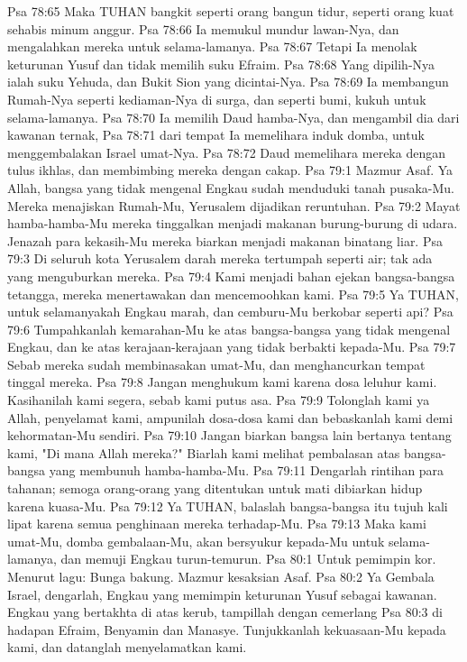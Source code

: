 Psa 78:65  Maka TUHAN bangkit seperti orang bangun tidur, seperti orang kuat sehabis minum anggur.
Psa 78:66  Ia memukul mundur lawan-Nya, dan mengalahkan mereka untuk selama-lamanya.
Psa 78:67  Tetapi Ia menolak keturunan Yusuf dan tidak memilih suku Efraim.
Psa 78:68  Yang dipilih-Nya ialah suku Yehuda, dan Bukit Sion yang dicintai-Nya.
Psa 78:69  Ia membangun Rumah-Nya seperti kediaman-Nya di surga, dan seperti bumi, kukuh untuk selama-lamanya.
Psa 78:70  Ia memilih Daud hamba-Nya, dan mengambil dia dari kawanan ternak,
Psa 78:71  dari tempat Ia memelihara induk domba, untuk menggembalakan Israel umat-Nya.
Psa 78:72  Daud memelihara mereka dengan tulus ikhlas, dan membimbing mereka dengan cakap.
Psa 79:1  Mazmur Asaf. Ya Allah, bangsa yang tidak mengenal Engkau sudah menduduki tanah pusaka-Mu. Mereka menajiskan Rumah-Mu, Yerusalem dijadikan reruntuhan.
Psa 79:2  Mayat hamba-hamba-Mu mereka tinggalkan menjadi makanan burung-burung di udara. Jenazah para kekasih-Mu mereka biarkan menjadi makanan binatang liar.
Psa 79:3  Di seluruh kota Yerusalem darah mereka tertumpah seperti air; tak ada yang menguburkan mereka.
Psa 79:4  Kami menjadi bahan ejekan bangsa-bangsa tetangga, mereka menertawakan dan mencemoohkan kami.
Psa 79:5  Ya TUHAN, untuk selamanyakah Engkau marah, dan cemburu-Mu berkobar seperti api?
Psa 79:6  Tumpahkanlah kemarahan-Mu ke atas bangsa-bangsa yang tidak mengenal Engkau, dan ke atas kerajaan-kerajaan yang tidak berbakti kepada-Mu.
Psa 79:7  Sebab mereka sudah membinasakan umat-Mu, dan menghancurkan tempat tinggal mereka.
Psa 79:8  Jangan menghukum kami karena dosa leluhur kami. Kasihanilah kami segera, sebab kami putus asa.
Psa 79:9  Tolonglah kami ya Allah, penyelamat kami, ampunilah dosa-dosa kami dan bebaskanlah kami demi kehormatan-Mu sendiri.
Psa 79:10  Jangan biarkan bangsa lain bertanya tentang kami, "Di mana Allah mereka?" Biarlah kami melihat pembalasan atas bangsa-bangsa yang membunuh hamba-hamba-Mu.
Psa 79:11  Dengarlah rintihan para tahanan; semoga orang-orang yang ditentukan untuk mati dibiarkan hidup karena kuasa-Mu.
Psa 79:12  Ya TUHAN, balaslah bangsa-bangsa itu tujuh kali lipat karena semua penghinaan mereka terhadap-Mu.
Psa 79:13  Maka kami umat-Mu, domba gembalaan-Mu, akan bersyukur kepada-Mu untuk selama-lamanya, dan memuji Engkau turun-temurun.
Psa 80:1  Untuk pemimpin kor. Menurut lagu: Bunga bakung. Mazmur kesaksian Asaf.
Psa 80:2  Ya Gembala Israel, dengarlah, Engkau yang memimpin keturunan Yusuf sebagai kawanan. Engkau yang bertakhta di atas kerub, tampillah dengan cemerlang
Psa 80:3  di hadapan Efraim, Benyamin dan Manasye. Tunjukkanlah kekuasaan-Mu kepada kami, dan datanglah menyelamatkan kami.
